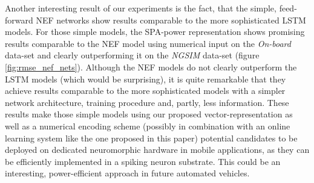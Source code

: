 Another interesting result of our experiments is the fact, that the simple, feed-forward \ac{NEF} networks show results comparable to the more sophisticated \ac{LSTM} models.
For those simple models, the \ac{SPA}-power representation shows promising results comparable to the \ac{NEF} model using numerical input on the \emph{On-board} data-set and clearly outperforming it on the \emph{\ac{NGSIM}} data-set (figure \ref{fig:rmse_nef_nets}).
Although the \ac{NEF} models do not clearly outperform the \ac{LSTM} models (which would be surprising), it is quite remarkable that they achieve results comparable to the more sophisticated models with a simpler network architecture, training procedure and, partly, less information.
These results make those simple models using our proposed vector-representation as well as a numerical encoding scheme (possibly in combination with an online learning system like the one proposed in this paper) potential candidates to be deployed on dedicated neuromorphic hardware in mobile applications, as they can be efficiently implemented in a spiking neuron substrate.
This could be an interesting, power-efficient approach in future automated vehicles.

